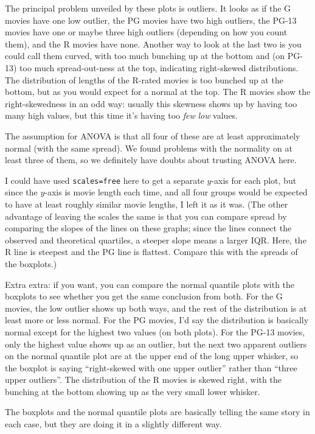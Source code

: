 \documentclass[]{tufte-book}
\theoremstyle{definition}
\theoremstyle{definition}
\theoremstyle{definition}
\theoremstyle{remark}
\begin{document}
The principal problem unveiled by these plots is outliers. It looks as
if the G movies have one low outlier, the PG movies have two high
outliers, the PG-13 movies have one or maybe three high outliers
(depending on how you count them), and the R movies have none. Another
way to look at the last two is you could call them curved, with too much
bunching up at the bottom and (on PG-13) too much spread-out-ness at the
top, indicating right-skewed distributions. The distribution of lengths
of the R-rated movies is too bunched up at the bottom, but as you would
expect for a normal at the top. The R movies show the right-skewedness
in an odd way: usually this skewness shows up by having too many high
values, but this time it's having too \emph{few} \emph{low} values.

The assumption for ANOVA is that all four of these are at least
approximately normal (with the same spread). We found problems with the
normality on at least three of them, so we definitely have doubts about
trusting ANOVA here.

I could have used \texttt{scales=free} here to get a separate \(y\)-axis
for each plot, but since the \(y\)-axis is movie length each time, and
all four groups would be expected to have at least roughly similar movie
lengths, I left it as it was. (The other advantage of leaving the scales
the same is that you can compare spread by comparing the slopes of the
lines on these graphs; since the lines connect the observed and
theoretical quartiles, a steeper slope means a larger IQR. Here, the R
line is steepest and the PG line is flattest. Compare this with the
spreads of the boxplots.)

Extra extra: if you want, you can compare the normal quantile plots with
the boxplots to see whether you get the same conclusion from both. For
the G movies, the low outlier shows up both ways, and the rest of the
distribution is at least more or less normal. For the PG movies, I'd say
the distribution is basically normal except for the highest two values
(on both plots). For the PG-13 movies, only the highest value shows up
as an outlier, but the next two apparent outliers on the normal quantile
plot are at the upper end of the long upper whisker, so the boxplot is
saying ``right-skewed with one upper outlier'' rather than ``three upper
outliers''. The distribution of the R movies is skewed right, with the
bunching at the bottom showing up as the very small lower whisker.

The boxplots and the normal quantile plots are basically telling the
same story in each case, but they are doing it in a slightly different
way.
\end{document}
